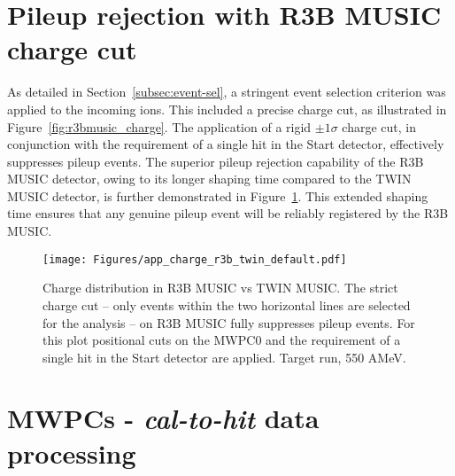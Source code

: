 \begin{appendices}
\section {Pileup rejection with R3B MUSIC charge cut}\label{app:r3bmusic_pileup}

As detailed in Section~\ref{subsec:event-sel}, a stringent event selection criterion was applied to the incoming ions. This included a precise charge cut, as illustrated in Figure~\ref{fig:r3bmusic_charge}. The application of a rigid $\pm 1 \sigma$ charge cut, in conjunction with the requirement of a single hit in the Start detector, effectively suppresses pileup events. The superior pileup rejection capability of the R3B MUSIC detector, owing to its longer shaping time compared to the TWIN MUSIC detector, is further demonstrated in Figure~\ref{fig:r3b_vs_twin_charge_def}. This extended shaping time ensures that any genuine pileup event will be reliably registered by the R3B MUSIC.
\begin{figure}[htpb]
    \centering
    \texttt{[image: Figures/app\_charge\_r3b\_twin\_default.pdf]}
    \caption{
	Charge distribution in R3B MUSIC vs TWIN MUSIC. The strict charge cut -- only events within the two horizontal lines are selected for the analysis -- on R3B MUSIC fully suppresses pileup events. For this plot positional cuts on the MWPC0  and the requirement of a single hit in the Start detector are applied. Target run, 550 AMeV. 
    }
    \label{fig:r3b_vs_twin_charge_def}
\end{figure}

\section {MWPCs - \textit{cal-to-hit} data processing}



\end{appendices}
